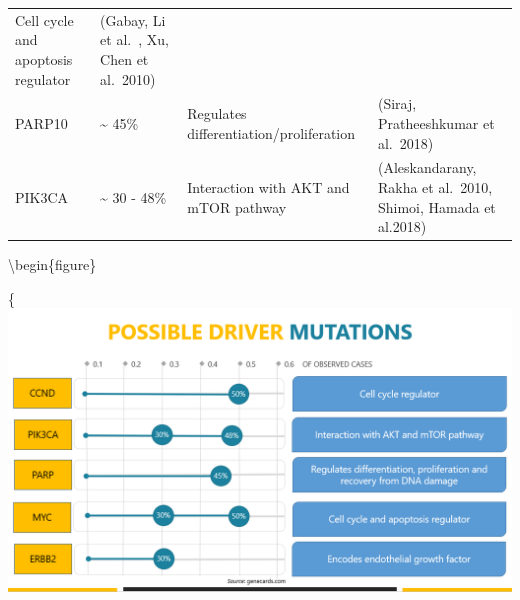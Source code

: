 \documentclass[]{article}
\begin{document}
\begin{longtable}[]{@{}llll@{}}
\begin{minipage}[t]{0.27\columnwidth}
Cell cycle and apoptosis regulator\strut
\end{minipage} & \begin{minipage}[t]{0.41\columnwidth}\raggedright
(Gabay, Li et al.~, Xu, Chen et al.~2010)\strut
\end{minipage}\tabularnewline
\begin{minipage}[t]{0.07\columnwidth}\raggedright
PARP10\strut
\end{minipage} & \begin{minipage}[t]{0.14\columnwidth}\raggedright
\textasciitilde{} 45\%\strut
\end{minipage} & \begin{minipage}[t]{0.27\columnwidth}\raggedright
Regulates differentiation/proliferation\strut
\end{minipage} & \begin{minipage}[t]{0.41\columnwidth}\raggedright
(Siraj, Pratheeshkumar et al.~2018)\strut
\end{minipage}\tabularnewline
\begin{minipage}[t]{0.07\columnwidth}\raggedright
PIK3CA\strut
\end{minipage} & \begin{minipage}[t]{0.14\columnwidth}\raggedright
\textasciitilde{} 30 - 48\%\strut
\end{minipage} & \begin{minipage}[t]{0.27\columnwidth}\raggedright
Interaction with AKT and mTOR pathway\strut
\end{minipage} & \begin{minipage}[t]{0.41\columnwidth}\raggedright
(Aleskandarany, Rakha et al.~2010, Shimoi, Hamada et al.2018)\strut
\end{minipage}\tabularnewline
\bottomrule
\end{longtable}

\textbackslash begin\{figure\}

\{\centering \includegraphics[width=1\linewidth]{Possible_Driver_Mutations}
\end{document}
